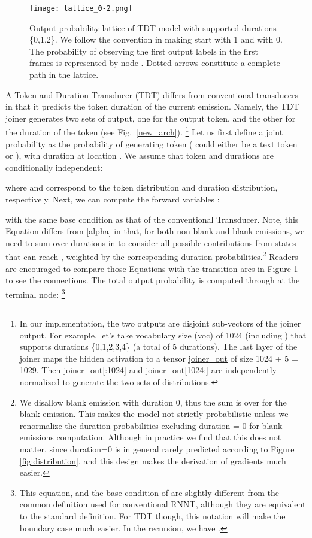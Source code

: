 \documentclass{article}
\begin{document}
\begin{figure}[t]
    \centering
    \texttt{[image: lattice\_0-2.png]}
    \caption{Output probability lattice of  TDT model with supported durations \{0,1,2\}. We follow the convention in \cite{graves2012sequence} making  start with 1 and  with 0. The probability of observing the first  output labels  in the first   frames is represented by node .  Dotted arrows constitute a complete path in the lattice. }   
\label{new_lattice}
\end{figure} 
A Token-and-Duration Transducer (TDT) differs from conventional transducers in that it  predicts the token duration of the current emission. 
Namely, the TDT joiner  generates two sets of output, one for the output token, and the other for the duration of the token (see Fig.~\ref{new_arch}).
\footnote{In our implementation, the two outputs are disjoint sub-vectors of the joiner output. For example, let's take vocabulary size (voc) of 1024 (including ) that supports durations \{0,1,2,3,4\} (a total of 5 durations). The last layer of the joiner maps the hidden  activation to a tensor \url{joiner_out} of size 1024 + 5 = 1029. Then \url{joiner_out[:1024]} and \url{joiner_out[1024:]} are independently normalized  to generate the two sets of distributions.}
Let us first define a joint probability  as the probability of generating token  ( could either be a text token or ), with duration  at location .
We assume that token and durations are conditionally independent:  

where  and  correspond to the token distribution and duration distribution, respectively.
Next, we can compute the forward variables :

with the same base condition  as that of the conventional Transducer. 
Note, this Equation differs from \ref{alpha} in that, for both non-blank  and blank emissions, we need to sum over  durations in  to consider all possible contributions from  states that can reach , weighted by the corresponding duration probabilities.\footnote{We disallow blank emission with duration 0, thus the sum is over  for the blank emission. This makes the model not strictly probabilistic unless we renormalize the duration probabilities excluding duration = 0 for blank emissions computation. Although in practice we find that this does not matter, since duration=0 is in general rarely predicted according to Figure \ref{fig:distribution}, and this design makes the derivation of gradients much easier.}
Readers are encouraged to compare those Equations with the transition arcs in Figure \ref{new_lattice} to see the connections.
The total output probability  is computed through  at the terminal node:
\footnote{This equation, and the base condition of  are slightly different from the common definition used for conventional RNNT, although they are equivalent to the standard definition. For TDT though, this notation will make the boundary case much easier. In the recursion, we have .}
\end{document}
